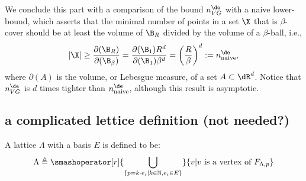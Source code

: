 
We conclude this part with a comparison of the bound $n_{VG}^{\de}$ with a naive lower-bound, which asserts that the minimal number of points in a set $\X$ that is $\beta$-cover should be at least the volume of $\B_R$ divided by the volume of a $\beta$-ball, i.e., 
\begin{equation}
        |\X|\geq \frac{\partial(\B_R)}{\partial(\B_\beta)}=\frac{\partial(\B_1) R^d}{\partial(\B_ 1)\beta^d}=\left(\frac{R}{\beta}\right)^d:=n_{\text{naive}}^{\de}, 
\end{equation}
where $\partial(A)$ is the volume, or Lebesgue measure, of a set $A\subset \dR^d$. 
Notice that $n_{VG}^{\de}$ is $d$ times tighter than $n_{\text{naive}}^{\de}$, although this result is asymptotic. 


\subsection{a complicated lettice definition (not needed?)}
A lattice $\Lambda$ with a basis $E$ is defined to be:
\[
    \Lambda\triangleq\smashoperator[r]{\bigcup_{\{p=k\cdot e_i | k\in \mathbb{N},e_i\in E\}}}\{v|v\text{ is a vertex of } F_{\Lambda,p}\}
\]

